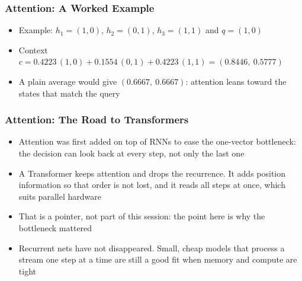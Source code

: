 \begin{frame}[fragile] \frametitle{Attention: A Worked Example}
\begin{itemize}
\item Example: $h_1 = (1,0)$, $h_2 = (0,1)$, $h_3 = (1,1)$ and $q = (1,0)$
\end{itemize}
\begin{center}
\small
{}
\end{center}
\begin{itemize}
\item Context $c = 0.4223\,(1,0) + 0.1554\,(0,1) + 0.4223\,(1,1) = (0.8446,\ 0.5777)$
\item A plain average would give $(0.6667,\ 0.6667)$: attention leans toward the states that match the query
\end{itemize}
\end{frame}

\begin{frame}[fragile] \frametitle{Attention: The Road to Transformers}
\begin{itemize}
\item Attention was first added on top of RNNs to ease the one-vector bottleneck: the decision can look back at every step, not only the last one
\item A Transformer keeps attention and drops the recurrence. It adds position information so that order is not lost, and it reads all steps at once, which suits parallel hardware
\item That is a pointer, not part of this session: the point here is why the bottleneck mattered
\item Recurrent nets have not disappeared. Small, cheap models that process a stream one step at a time are still a good fit when memory and compute are tight
\end{itemize}
\end{frame}

